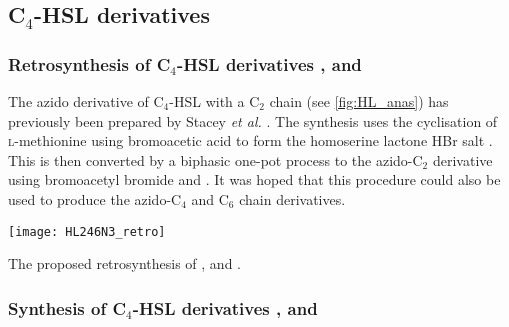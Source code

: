 \subsection{C$_4$-HSL derivatives}

\subsubsection{Retrosynthesis of C$_4$-HSL derivatives ,  and }

The azido derivative of C$_4$-HSL with a C$_2$ chain  (see \ref{fig:HL_anas}) has previously been prepared by Stacey \textit{et al.} \cite{Stacy2013}. The synthesis uses the cyclisation of \textsc{l}-methionine  using bromoacetic acid to form the homoserine lactone HBr salt . This is then converted by a biphasic one-pot process to the azido-C$_2$ derivative  using bromoacetyl bromide  and . It was hoped that this procedure could also be used to produce the azido-C$_4$ and C$_6$ chain derivatives.

\begin{scheme}[H]
	\begin{center}
		\texttt{[image: HL246N3\_retro]}
		\caption{The proposed retrosynthesis of ,  and . \label{sch:HL246N3_retro}}
	\end{center}
\end{scheme}


\subsubsection{Synthesis of C$_4$-HSL derivatives ,  and \label{sec:HL4N3}}

